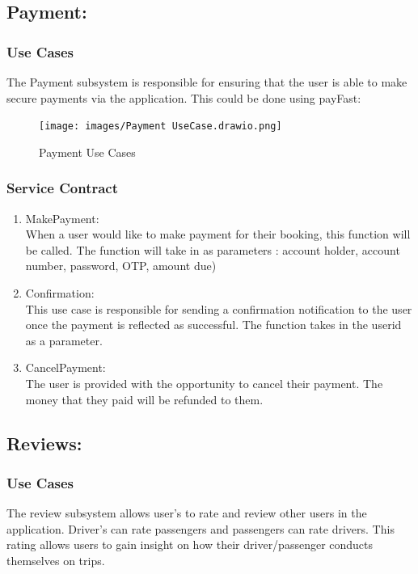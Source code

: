 \documentclass[hidelinks, 12pt, a4paper]{article}
\begin{document}
\newpage
\subsection{Payment:}
\subsubsection{Use Cases}
The Payment subsystem is responsible for ensuring that the user is able to make secure payments via the application. This could be done using payFast:

\begin{figure}[H]

      \centering
      \texttt{[image: images/Payment UseCase.drawio.png]}
      \caption{Payment Use Cases}
      \label{fig:User UseCases}

\end{figure}

\subsubsection{Service Contract}
\begin{enumerate}[label=U1.\arabic*]

      \item MakePayment:\\
            When a user would like to make payment for their booking, this function will be called. The function will take in as parameters : account holder, account number, password, OTP, amount due)

      \item Confirmation:\\
            This use case is responsible for sending a confirmation notification to the user once the payment is reflected as successful. The function takes in the userid as a parameter.

      \item CancelPayment: \\
            The user is provided with the opportunity to cancel their payment. The money that they paid will be refunded to them.

\end{enumerate}

\vspace{1cm}
\subsection{Reviews:}
\subsubsection{Use Cases}
The review subsystem allows user’s to rate and review other users in the application. Driver’s can rate passengers and passengers can rate drivers. This rating allows users to gain insight on how their driver/passenger conducts themselves on trips.
\end{document}
